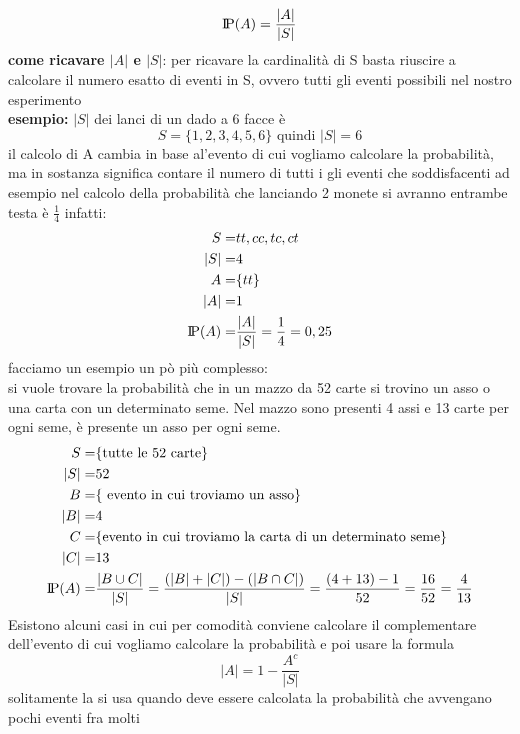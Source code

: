 \documentclass{article}
\newcommand{\probP}{\text{I\kern-0.15em P}}
\begin{document}
    \begin{equation*}
        \probP(A) = \frac{|A|}{|S|}
    \end{equation*}
    \textbf{come ricavare $|A|$ e $|S|$}: per ricavare la cardinalità di S basta riuscire a calcolare il numero esatto di eventi in S, ovvero tutti gli eventi possibili nel nostro esperimento\\
    \textbf{esempio:} $|S|$ dei lanci di un dado a 6 facce è 
        \begin{equation*}
            S=\{1,2,3,4,5,6\} \text{ quindi }|S|=6
        \end{equation*} 
        il calcolo di A cambia in base al'evento di cui vogliamo calcolare la probabilità, ma in sostanza significa contare il numero di tutti i gli eventi che soddisfacenti ad esempio nel calcolo della probabilità che lanciando 2 monete si avranno entrambe testa è $\frac{1}{4}$ infatti:
        \begin{align*}
            S=&{tt,cc,tc,ct} \\
            |S|=&4 \\
            A=& \{ tt \} \\
            |A|=& 1 \\
            \probP(A)=&\frac{|A|}{|S|}=\frac{1}{4}=0,25
        \end{align*}
        facciamo un esempio un pò più complesso:\\
        si vuole trovare la probabilità che in un mazzo da 52 carte si trovino un asso o una carta con un determinato seme. Nel mazzo sono presenti 4 assi e 13 carte per ogni seme, è presente un asso per ogni seme.
        \begin{align*}
            S=&\{ \text{tutte le 52 carte} \} \\
            |S|=&52 \\
            B=&\{ \text{ evento in cui troviamo un asso} \} \\
            |B|=&4 \\
            C=& \{ \text{evento in cui troviamo la carta di un determinato seme} \}\\
            |C|=&13 \\
            \probP(A)=& \frac{|B\cup C|}{|S|}= \frac{(|B|+|C|)-(|B \cap C|)}{|S|}= \frac{(4+13)-1}{52} =\frac{16}{52}=\frac{4}{13}
        \end{align*}
        Esistono alcuni casi in cui per comodità conviene calcolare il complementare dell'evento di cui vogliamo calcolare la probabilità e poi usare la formula
        \begin{equation*}
            |A|= 1-\frac{A^c}{|S|}
        \end{equation*}
        solitamente la si usa quando deve essere calcolata la probabilità che avvengano pochi eventi fra molti
\end{document}

